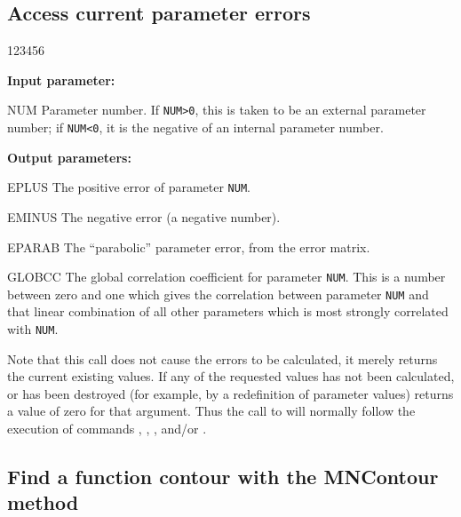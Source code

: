 \subsection{Access current parameter errors}

 
\begin{DLtt}{123456}
\item[{\rm\bf Input parameter:}]
\item[NUM]    Parameter number. 
              If \texttt{NUM>0}, this is taken to be an external parameter number; 
              if \texttt{NUM<0}, it is the negative of an internal parameter number.
\item[{\rm\bf Output parameters:}]
\item[EPLUS]  The positive  error of parameter \texttt{NUM}.
\item[EMINUS] The negative  error (a negative number).
\item[EPARAB] The ``parabolic'' parameter error, from the error matrix.
\item[GLOBCC] The global correlation coefficient for parameter \texttt{NUM}.
              This is a number between zero and one which gives the correlation
              between parameter \texttt{NUM} and that linear combination of all other
              parameters which is most strongly correlated with \texttt{NUM}.
\end{DLtt}
 
Note that this call does not cause the errors to be
calculated, it merely returns the current existing values.
If any of the requested values has not been calculated, or has
been destroyed (for example, by a redefinition of parameter values)
 returns a value of zero for that argument.
Thus the call to  will normally follow the execution of
commands , , 
, and/or .
 
\subsection{Find a function contour with the MNContour method}

 
